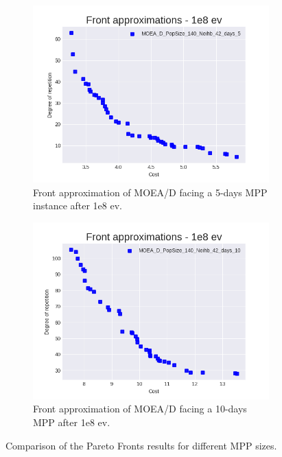 \begin{figure}[H]
\begin{subfigure}{.5\textwidth}
  \centering
  \includegraphics[width=1.0\linewidth]{../experiments/plots/fronts/5_days/MOEA_D_PopSize_140_Neihb_42_days_5_6.png}
\caption{Front approximation of MOEA/D facing a 5-days MPP instance after 1e8 ev.}
\end{subfigure}%
\begin{subfigure}{.5\textwidth}
  \centering
  \includegraphics[width=1.0\linewidth]{../experiments/plots/fronts/10_days/MOEA_D_PopSize_140_Neihb_42_days_10_6.png}
\caption{Front approximation of MOEA/D facing a 10-days MPP after 1e8 ev.}
\end{subfigure}
\caption{Comparison of the Pareto Fronts results for different MPP sizes.}
\label{fig:fronts_5_10}
\end{figure}


